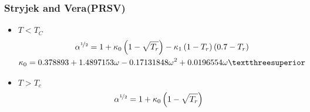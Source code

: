 \subsubsection{Stryjek and Vera(PRSV)\cite{stryjekVeraPureCompounds} }
\begin{itemize}

\item{$T < T_C$}
\begin{gather}
	\alpha^{\nicefrac{1}{2}} = 1 + \kappa_0 \left(1-\sqrt{T_r}\right)- \kappa_1\left(1-T_r\right)\left(0.7-T_r\right)
	\\
	\kappa_0 = 0.378893+1.4897153\omega-0.17131848\omega^2+0.0196554\omega³
\end{gather}

\item{$T > T_c$}
\begin{equation}
	\alpha^{\nicefrac{1}{2}} = 1 + \kappa_0\left(1- \sqrt{T_r}\right)
\end{equation}

 \end{itemize}
